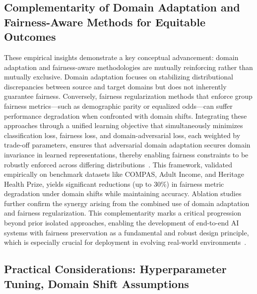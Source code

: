 \documentclass[sigconf]{acmart}
\begin{document}
\subsection{Complementarity of Domain Adaptation and Fairness-Aware Methods for Equitable Outcomes}

These empirical insights demonstrate a key conceptual advancement: domain adaptation and fairness-aware methodologies are mutually reinforcing rather than mutually exclusive. Domain adaptation focuses on stabilizing distributional discrepancies between source and target domains but does not inherently guarantee fairness. Conversely, fairness regularization methods that enforce group fairness metrics—such as demographic parity or equalized odds—can suffer performance degradation when confronted with domain shifts. Integrating these approaches through a unified learning objective that simultaneously minimizes classification loss, fairness loss, and domain-adversarial loss, each weighted by trade-off parameters, ensures that adversarial domain adaptation secures domain invariance in learned representations, thereby enabling fairness constraints to be robustly enforced across differing distributions~\cite{ref26}. This framework, validated empirically on benchmark datasets like COMPAS, Adult Income, and Heritage Health Prize, yields significant reductions (up to 30\%) in fairness metric degradation under domain shifts while maintaining accuracy. Ablation studies further confirm the synergy arising from the combined use of domain adaptation and fairness regularization. This complementarity marks a critical progression beyond prior isolated approaches, enabling the development of end-to-end AI systems with fairness preservation as a fundamental and robust design principle, which is especially crucial for deployment in evolving real-world environments~\cite{ref26}.

\subsection{Practical Considerations: Hyperparameter Tuning, Domain Shift Assumptions}
\end{document}
